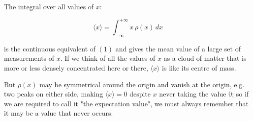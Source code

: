 The integral over all values of $x$:

$$
\langle x \rangle =
\int_{-\infty}^{+\infty}
x\,\rho(x)
\,dx
$$

is the continuous equivalent of $(1)$ and gives the mean value of a large set of measurements of $x$. If we think of all the values of $x$ as a cloud of matter that is more or less densely concentrated here or there, $\langle x \rangle$ is like its centre of mass.

But $\rho(x)$ may be symmetrical around the origin and vanish at the origin, e.g. two peaks on either side, making $\langle x \rangle = 0$ despite $x$ never taking the value $0$; so if we are required to call it "the expectation value", we must always remember that it may be a value that never occurs.
